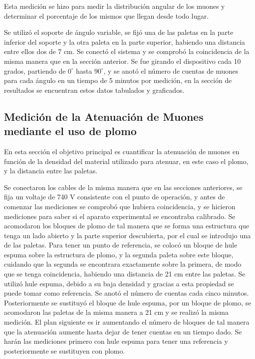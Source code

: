 \documentclass[a4paper,10pt]{article}
\numberwithin{equation}{section}
\begin{document}
Esta medición se hizo para medir la distribución angular de los muones y determinar 
el porcentaje de los mismos que llegan desde todo lugar.

\vspace{.3cm}

Se utilizó el soporte de ángulo variable, se fijó una de las paletas en la parte 
inferior del soporte y la otra paleta en la parte superior, habiendo una distancia 
entre ellos dos de 7 cm. Se conectó el sistema y se comprobó la coincidencia
de la misma manera que en la sección anterior. Se fue girando el dispositivo cada 
10 grados, partiendo de $0^\circ$ hasta $90^\circ$, y se anotó el número de cuentas 
de muones para cada ángulo en un tiempo de 5 minutos por medición, en la sección
de resultados se encuentran estos datos tabulados y graficados.

\subsection{Medición de la Atenuación de Muones mediante el uso de plomo}
\label{ss:medicionplomo}

En esta sección el objetivo principal es cuantificar la atenuación de muones en 
función de la densidad del material utilizado para atenuar, en este caso el plomo, 
y la distancia entre las paletas. 

\vspace{.3cm}

Se conectaron los cables de la misma manera que en
las secciones anteriores, se fija un voltaje de 740 V consistente con el punto de 
operación, y antes de comenzar las 
mediciones se comprobó que hubiera coincidencia, y se hicieron mediciones para saber
si el aparato experimental se encontraba calibrado. Se acomodaron los bloques de plomo 
de tal manera que se forma una estructura que tenga un lado abierto y la parte 
superior descubierta, por el cual se introdujo una de las paletas. Para tener un 
punto de referencia, se colocó un bloque de hule espuma sobre la estructura de plomo,
y la segunda paleta sobre este bloque, cuidando que la segunda se encontrara 
exactamente sobre la primera, de modo que se tenga coincidencia, habiendo una 
distancia de 21 cm entre las paletas. Se utilizó hule espuma, debido a su baja 
densidad y gracias a esta propiedad se puede tomar como referencia. Se anotó el 
número de cuentas cada cinco minutos. Posteriormente se sustituyó el bloque de hule
espuma, por un bloque de plomo, se acomodaron las paletas de la misma manera a 21 cm
y se realizó la misma medición. El plan siguiente es ir aumentando el número de bloques de tal
manera que la atenuación aumente hasta dejar de tener cuentas en un tiempo dado. 
Se harán las mediciones primero con hule espuma para tener una referencia y
posteriormente se sustituyen con plomo.
\end{document}
